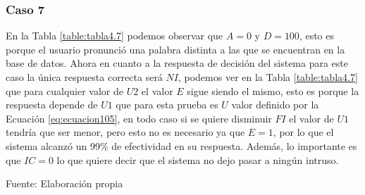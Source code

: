 \subsubsection{Caso 7}
En la Tabla \ref{table:tabla4.7} podemos observar que $A = 0$ y $D = 100$, esto es porque el usuario pronunció una palabra distinta a las que se encuentran en la base de datos.
\vskip 0.5cm
Ahora en cuanto a la respuesta de decisión del sistema para este caso la única respuesta correcta será $NI$, podemos ver en la Tabla \ref{table:tabla4.7} que para cualquier valor de $U2$ el valor $E$ sigue siendo el mismo, esto es porque la respuesta depende de $U1$ que para esta prueba es $U$ valor definido por la Ecuación \eqref{eq:ecuacion105}, en todo caso si se quiere disminuir $FI$ el valor de $U1$ tendría que ser menor, pero esto no es necesario ya que $E = 1$, por lo que el sistema alcanzó un 99\% de efectividad en su respuesta. Además, lo importante es que $IC = 0$ lo que quiere decir que el sistema no dejo pasar a ningún intruso.

\begin{center}
\begin{table}[H]
\centering
\caption{\small{Resultados para obtener U2 en el caso 7.}}
\label{table:tabla4.7}
\vskip 0.2cm
\begin{center}
\vskip 0.2cm
{\small{Fuente: Elaboración propia}}
\end{center}
\end{table}
\end{center}

